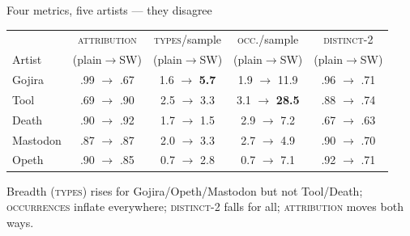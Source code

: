 \documentclass[aspectratio=169]{beamer}
\newcommand{\take}[1]{\vskip3pt\footnotesize\textcolor{accent}{#1}}
\newcommand{\metric}[1]{\textsc{#1}}   %
\begin{document}
\begin{frame}{Four metrics, five artists --- they disagree}
  \centering\small
  \begin{tabular}{@{}lcccc@{}}
    \toprule
           & \metric{attribution} & \metric{types}/sample & \metric{occ.}/sample & \metric{distinct-2} \\
    Artist & (plain$\rightarrow$SW) & (plain$\rightarrow$SW) & (plain$\rightarrow$SW) & (plain$\rightarrow$SW) \\
    \midrule
    Gojira   & .99 $\rightarrow$ .67 & 1.6 $\rightarrow$ \textbf{5.7} & 1.9 $\rightarrow$ 11.9 & .96 $\rightarrow$ .71 \\
    Tool     & .69 $\rightarrow$ .90 & 2.5 $\rightarrow$ 3.3 & 3.1 $\rightarrow$ \textbf{28.5} & .88 $\rightarrow$ .74 \\
    Death    & .90 $\rightarrow$ .92 & 1.7 $\rightarrow$ 1.5 & 2.9 $\rightarrow$ 7.2 & .67 $\rightarrow$ .63 \\
    Mastodon & .87 $\rightarrow$ .87 & 2.0 $\rightarrow$ 3.3 & 2.7 $\rightarrow$ 4.9 & .90 $\rightarrow$ .70 \\
    Opeth    & .90 $\rightarrow$ .85 & 0.7 $\rightarrow$ 2.8 & 0.7 $\rightarrow$ 7.1 & .92 $\rightarrow$ .71 \\
    \bottomrule
  \end{tabular}
  \take{Breadth (\metric{types}) rises for Gojira/Opeth/Mastodon but not Tool/Death; \metric{occurrences} inflate everywhere; \metric{distinct-2} falls for all; \metric{attribution} moves both ways.}
\end{frame}
\end{document}

